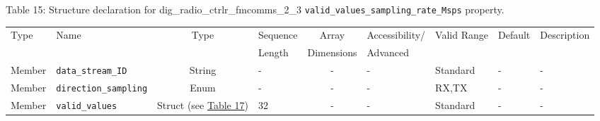 \documentclass{article}
\def\comp{dig\_radio\_ctrlr\_fmcomms\_2\_3}
\begin{document}
\begin{landscape}
	\noindent Table \hypertarget{tab15}{15}: Structure declaration for \comp{} \verb+valid_values_sampling_rate_Msps+ property.
	\begin{scriptsize}
		\noindent\begin{longtable}{|p{1.8cm}|p{3.6cm}|c|p{2cm}|c|p{2cm}|p{1.7cm}|p{0.8cm}|p{4.97cm}|}
			\hline
			\rowcolor{blue}
			Type         & Name                                & Type & Sequence & Array      & Accessibility/ & Valid Range  & Default & Description                                                                                                                                                                                                                       \\
			\rowcolor{blue}
			             &                                     &      & Length   & Dimensions & Advanced       &              &         &                                                                                                                                                                                                                             \\
			\hline
			Member       & \verb+data_stream_ID+               & String& -       & -          & -              & Standard     & -       & - \\
			\hline
			Member       & \verb+direction_sampling+           & Enum  & -       & -          & -              & RX,TX        & -       & - \\
			\hline
			Member       & \verb+valid_values+                 & Struct (see \hyperlink{tab17}{Table 17}) & 32      & -          & -              & Standard & -       & - \\
			\hline
		\end{longtable}
	\end{scriptsize}


\end{landscape}
\end{document}
